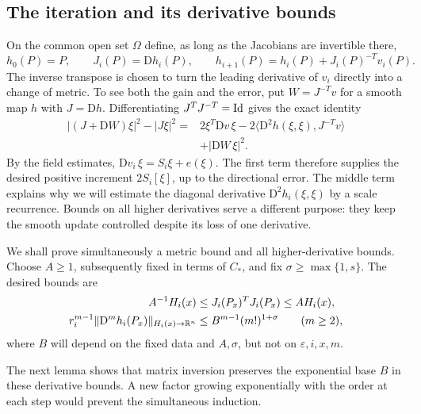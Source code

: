 \subsection{The iteration and its derivative bounds}

On the common open set $\Omega$ define, as long as the Jacobians are
invertible there,
\begin{equation}
 \label{re:iteration}
 h_0(P)=P,
 \qquad J_i(P)=\mathrm Dh_i(P),
 \qquad h_{i+1}(P)=h_i(P)+J_i(P)^{-T}v_i(P).
\end{equation}
The inverse transpose is chosen to turn the leading derivative of
$v_i$ directly into a change of metric.  To see both the gain and the
error, put $W=J^{-T}v$ for a smooth map $h$ with $J=\mathrm Dh$.
Differentiating $J^TJ^{-T}=\mathrm{Id}$ gives the exact identity
\begin{equation}
 \label{re:metric-step}
 \begin{aligned}
 |(J+\mathrm DW)\xi|^2-|J\xi|^2
   ={}&2\xi^T\mathrm Dv\,\xi
       -2\langle\mathrm D^2h(\xi,\xi),J^{-T}v\rangle\\
     &+|\mathrm DW\,\xi|^2.
 \end{aligned}
\end{equation}
By the field estimates, $\mathrm Dv_i\,\xi=S_i\xi+e(\xi)$.
The first term therefore supplies the desired positive increment
$2S_i[\xi]$, up to the directional error.  The middle term explains
why we will estimate the diagonal derivative
$\mathrm D^2h_i(\xi,\xi)$ by a scale recurrence.  Bounds on all
higher derivatives serve a different purpose: they keep the smooth
update controlled despite its loss of one derivative.

We shall prove simultaneously a metric bound and all higher-derivative
bounds.  Choose $A\ge1$, subsequently fixed in terms of $C_*$, and
fix $\sigma\ge\max\{1,s\}$.  The desired bounds are
\begin{align}
 A^{-1}H_i(x)&\le J_i(P_x)^TJ_i(P_x)\le A H_i(x),
      \label{re:metric-bootstrap}\\
 r_i^{m-1}\|\mathrm D^m h_i(P_x)\|_{H_i(x)\to\mathbb R^n}
       &\le B^{m-1}(m!)^{1+\sigma}\qquad(m\ge2),
      \label{re:jet-bootstrap}
\end{align}
where $B$ will depend on the fixed data and $A,\sigma$, but not on
$\varepsilon,i,x,m$.

The next lemma shows that matrix inversion preserves the exponential
base $B$ in these derivative bounds.  A new factor growing exponentially
with the order at each step would prevent the simultaneous induction.

